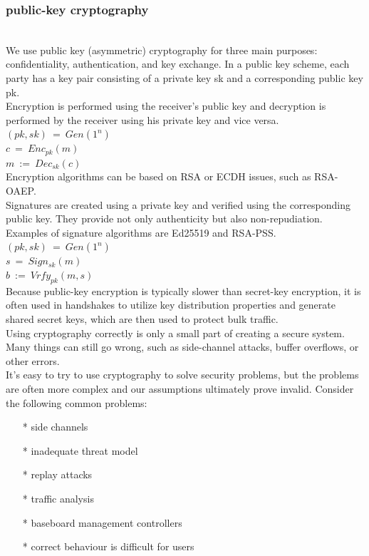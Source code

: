\subsubsection{public-key cryptography}\cite{b38}
\\
We use public key (asymmetric) cryptography for three main purposes: confidentiality, 
authentication, and key exchange. In a public key scheme, each party has a key pair 
consisting of a private key sk and a corresponding public key pk.
\\
Encryption is performed using the receiver's public key and decryption is performed 
by the receiver using his private key and vice versa.
\\
$(pk, sk) \ = \ Gen(1^n)$
\\
$c \ = \ Enc_{pk}(m)$
\\
$m \ := \ Dec_{sk}(c)$
\\
Encryption algorithms can be based on RSA or ECDH issues, such as RSA-OAEP.
\\
Signatures are created using a private key and verified using the corresponding public key. 
They provide not only authenticity but also non-repudiation. Examples of signature algorithms 
are Ed25519 and RSA-PSS.
\\
$(pk, sk) \ = \ Gen(1^n)$
\\
$s \ = \ Sign_{sk}(m)$
\\
$b \ := \ Vrfy_{pk}(m, s)$
\\
Because public-key encryption is typically slower than secret-key encryption, it is often 
used in handshakes to utilize key distribution properties and generate shared secret keys, 
which are then used to protect bulk traffic.
\\
Using cryptography correctly is only a small part of creating a secure system. Many things 
can still go wrong, such as side-channel attacks, buffer overflows, or other errors.
\\
It's easy to try to use cryptography to solve security problems, but the problems are often 
more complex and our assumptions ultimately prove invalid. Consider the following common problems:

\begin{enumerate}[]
    \item[*] side channels
    \item[*] inadequate threat model
    \item[*] replay attacks
    \item[*] traﬃc analysis
    \item[*] baseboard management controllers
    \item[*] correct behaviour is diﬃcult for users
    \end{enumerate}

